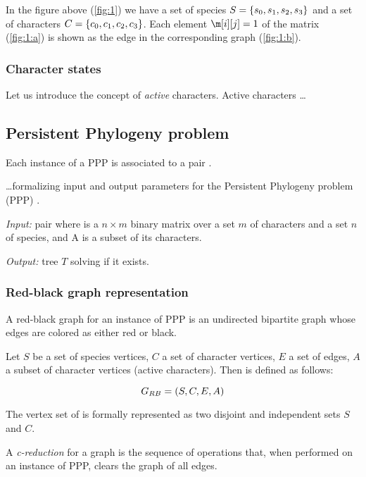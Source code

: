 In the figure above (\ref{fig:1}) we have a set of species $S = \{ \species[0], \species[1], \species[2], \species[3] \}$ and a set of characters $C = \{ \character[0], \character[1], \character[2], \character[3] \}$.
Each element $\m[i][j] = 1$ of the matrix (\ref{fig:1:a}) is shown as the edge \edge{\species[i]}{\character[j]} in the corresponding graph (\ref{fig:1:b}).

\subsubsection{Character states}\label{sssec:charstates}


Let us introduce the concept of \textit{active} characters.
Active characters  \dots

\subsection{Persistent Phylogeny problem}\label{ssec:ppp}


Each instance of a PPP is associated to a pair \ma{}.

 \dots formalizing input and output parameters for the Persistent Phylogeny problem (PPP) \cite{Bonizzoni2016SolvingTP}.

\begin{definition}\label{def:ppp}
  \text{}

  \textit{Input:} pair \ma{} where \m{} is a $n \times m$ binary matrix over a set $m$ of characters and a set $n$ of species, and A is a subset of its characters.

  \textit{Output:} tree $T$ solving \m{} if it exists.
\end{definition}

\subsubsection{Red-black graph representation}\label{sssec:grb}

A red-black graph for an instance of PPP is an undirected bipartite graph whose edges are colored as either red or black.

\begin{definition}\label{def:grb}
  Let $S$ be a set of species vertices, $C$ a set of character vertices, $E$ a set of edges, $A$ a subset of character vertices (active characters).
  Then \grb{} is defined as follows:

  \[ \grb{} = (S, C, E, A) \]

  The vertex set of \grb{} is formally represented as two disjoint and independent sets $S$ and $C$.
\end{definition}


A \textit{c-reduction} for a graph \grb{} is the sequence of operations that, when performed on an instance of PPP, clears the graph of all edges.
